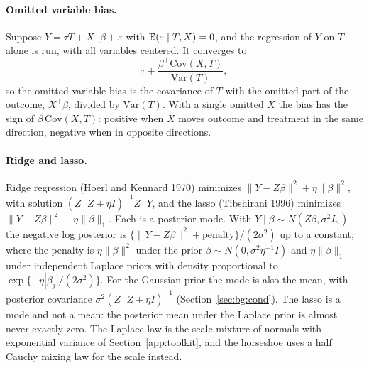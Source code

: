 \paragraph{Omitted variable bias.} Suppose $Y = \tau T + X^\top\beta + \varepsilon$ with $\mathbb{E}(\varepsilon \mid T, X) = 0$, and the regression of $Y$ on $T$ alone is run, with all variables centered. It converges to
\[
\tau + \frac{\beta^\top\mathrm{Cov}(X, T)}{\mathrm{Var}(T)},
\]
so the omitted variable bias is the covariance of $T$ with the omitted part of the outcome, $X^\top\beta$, divided by $\mathrm{Var}(T)$. With a single omitted $X$ the bias has the sign of $\beta\,\mathrm{Cov}(X, T)$: positive when $X$ moves outcome and treatment in the same direction, negative when in opposite directions.

\paragraph{Ridge and lasso.} Ridge regression (Hoerl and Kennard 1970) minimizes $\|Y - Z\beta\|^2 + \eta\|\beta\|^2$, with solution $(Z^\top Z + \eta I)^{-1}Z^\top Y$, and the lasso (Tibshirani 1996) minimizes $\|Y - Z\beta\|^2 + \eta\|\beta\|_1$. Each is a posterior mode. With $Y \mid \beta \sim N(Z\beta, \sigma^2I_n)$ the negative log posterior is $\{\|Y - Z\beta\|^2 + \text{penalty}\}/(2\sigma^2)$ up to a constant, where the penalty is $\eta\|\beta\|^2$ under the prior $\beta \sim N(0, \sigma^2\eta^{-1}I)$ and $\eta\|\beta\|_1$ under independent Laplace priors with density proportional to $\exp\{-\eta|\beta_j|/(2\sigma^2)\}$. For the Gaussian prior the mode is also the mean, with posterior covariance $\sigma^2(Z^\top Z + \eta I)^{-1}$ (Section~\ref{sec:bg:cond}). The lasso is a mode and not a mean: the posterior mean under the Laplace prior is almost never exactly zero. The Laplace law is the scale mixture of normals with exponential variance of Section~\ref{app:toolkit}, and the horseshoe uses a half Cauchy mixing law for the scale instead.

